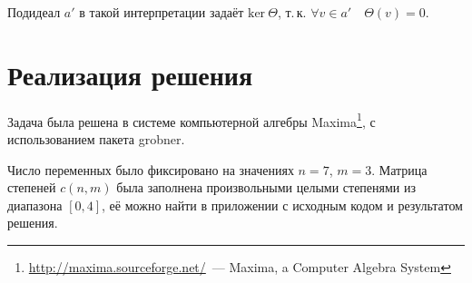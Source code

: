 \documentclass[a4paper,12pt]{article}
\begin{document}
Подидеал $a'$ в такой интерпретации задаёт $\textrm{ker}\ \Theta$, т.\,к. $\forall v \in a' \quad \Theta(v) = 0$.

\section{Реализация решения}
Задача была решена в системе компьютерной алгебры 
Maxima\footnote{\url{http://maxima.sourceforge.net/}~--- Maxima, a Computer Algebra System}, 
с использованием пакета grobner.

Число переменных было фиксировано на значениях $n = 7$, $m = 3$.
Матрица степеней $c(n, m)$ была заполнена произвольными целыми степенями из диапазона $[0, 4]$,
её можно найти в приложении с исходным кодом и результатом решения.


\end{document}
